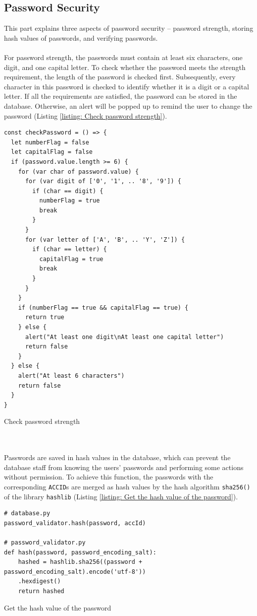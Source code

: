 \documentclass{article}
\begin{document}
\subsection{Password Security}
This part explains three aspects of password security – password strength, storing hash values of passwords, and verifying passwords. 
\\\\
For password strength, the passwords must contain at least six characters, one digit, and one capital letter. To check whether the password meets the strength requirement, the length of the password is checked first. Subsequently, every character in this password is checked to identify whether it is a digit or a capital letter. If all the requirements are satisfied, the password can be stored in the database. Otherwise, an alert will be popped up to remind the user to change the password (Listing \ref{listing: Check password strength}).
\begin{listing}[!htp]
\begin{verbatim}
const checkPassword = () => {
  let numberFlag = false
  let capitalFlag = false
  if (password.value.length >= 6) {
    for (var char of password.value) {
      for (var digit of ['0', '1', .. '8', '9']) {
        if (char == digit) {
          numberFlag = true
          break
        }
      }
      for (var letter of ['A', 'B', .. 'Y', 'Z']) {
        if (char == letter) {
          capitalFlag = true
          break
        }
      }
    }
    if (numberFlag == true && capitalFlag == true) {
      return true
    } else {
      alert("At least one digit\nAt least one capital letter")
      return false
    }
  } else {
    alert("At least 6 characters")
    return false
  }
}
\end{verbatim}
\caption{Check password strength}
\label{listing: Check password strength}
\end{listing}
\\\\
Passwords are saved in hash values in the database, which can prevent the database staff from knowing the users’ passwords and performing some actions without permission. To achieve this function, the passwords with the corresponding \verb|ACCID|s are merged as hash values by the hash algorithm \verb|sha256()| of the library \verb|hashlib| (Listing \ref{listing: Get the hash value of the password}).
\begin{listing}[!htp]
\begin{verbatim}
# database.py
password_validator.hash(password, accId)

# password_validator.py
def hash(password, password_encoding_salt):
    hashed = hashlib.sha256((password + password_encoding_salt).encode('utf-8'))
    .hexdigest()
    return hashed
\end{verbatim}
\caption{Get the hash value of the password}
\label{listing: Get the hash value of the password}
\end{listing}
\end{document}
